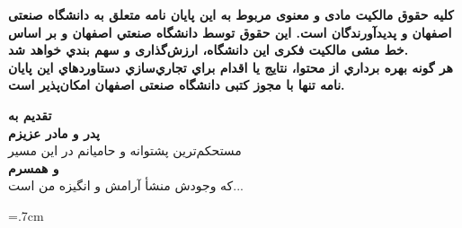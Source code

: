 %
%		
%		

\thispagestyle{empty}

\vspace*{3cm}
\textbf{\Large کلیه حقوق مالکیت مادی و معنوی مربوط به اين پايان نامه متعلق به دانشگاه صنعتی اصفهان و پدیدآورندگان است. این حقوق توسط دانشگاه صنعتي اصفهان و بر اساس خط مشی مالکیت فکری این دانشگاه، ارزش‌گذاری و سهم بندي خواهد شد.
\\
			هر گونه بهره برداري از محتوا، نتايج یا اقدام براي تجاري‌سازي دستاوردهاي اين پايان نامه تنها با مجوز کتبی دانشگاه صنعتی اصفهان امکان‌پذیر است.
}

\restoregeometry
\pagebreak

\thispagestyle{empty}
\vspace*{3cm}

{\nastaliq
	\Huge
	\raggedleft
	\textbf{\vspace{2cm}تقدیم به}	
	\\
\hspace{1cm}	
\textbf{\vspace{0.5cm}پدر و مادر عزیزم}
\\
\hspace{4cm}
	مستحکم‌ترین پشتوانه و حامیانم در این مسیر\vspace{1cm}
\\ 
\hspace{1cm}	
\textbf{\vspace{0.5cm}و همسرم}
\\
\hspace{4cm}
	که وجودش منشأ آرامش و انگیزه من است...

	
}
\pagebreak


\baselineskip=.7cm


